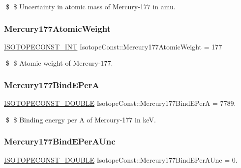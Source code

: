 \$ \$ Uncertainty in atomic mass of Mercury-\/177 in amu. \mbox{\label{group___isotope_const-_mercury-_hg177_ga0df81440e0b2c5a295667e5da7839fe9}} 
\subsubsection{\texorpdfstring{Mercury177\+Atomic\+Weight}{Mercury177AtomicWeight}}
{\footnotesize\ttfamily \mbox{\hyperlink{group___isotope_const-_macros_ga5f18360b3e99483a35c32d789e62621c}{I\+S\+O\+T\+O\+P\+E\+C\+O\+N\+S\+T\+\_\+\+I\+NT}} Isotope\+Const\+::\+Mercury177\+Atomic\+Weight = 177}

\$ \$ Atomic weight of Mercury-\/177. \mbox{\label{group___isotope_const-_mercury-_hg177_gad4069e299a49d5f4fb64b29d8d4d8156}} 
\subsubsection{\texorpdfstring{Mercury177\+Bind\+E\+PerA}{Mercury177BindEPerA}}
{\footnotesize\ttfamily \mbox{\hyperlink{group___isotope_const-_macros_ga8f45a7272ce02c0b4c65c44636ed719a}{I\+S\+O\+T\+O\+P\+E\+C\+O\+N\+S\+T\+\_\+\+D\+O\+U\+B\+LE}} Isotope\+Const\+::\+Mercury177\+Bind\+E\+PerA = 7789.}

\$ \$ Binding energy per A of Mercury-\/177 in keV. \mbox{\label{group___isotope_const-_mercury-_hg177_ga4a2e615db74cf7766e01a98b396258b1}} 
\subsubsection{\texorpdfstring{Mercury177\+Bind\+E\+Per\+A\+Unc}{Mercury177BindEPerAUnc}}
{\footnotesize\ttfamily \mbox{\hyperlink{group___isotope_const-_macros_ga8f45a7272ce02c0b4c65c44636ed719a}{I\+S\+O\+T\+O\+P\+E\+C\+O\+N\+S\+T\+\_\+\+D\+O\+U\+B\+LE}} Isotope\+Const\+::\+Mercury177\+Bind\+E\+Per\+A\+Unc = 0.}

